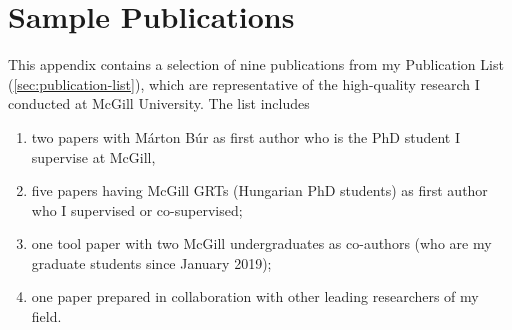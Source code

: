 \chapter{Sample Publications}
\label{sec:sample-publications}


This appendix contains a selection of nine publications from my Publication List (\autoref{sec:publication-list}), which are representative of the high-quality research I conducted at McGill University. The list includes 
\begin{enumerate}[leftmargin=0.5cm]
\item two papers with Márton Búr as first author who is the PhD student I supervise at McGill, 
\item five papers having McGill GRTs (Hungarian PhD students) as first author who I supervised or co-supervised;
\item one tool paper with two McGill undergraduates as co-authors (who are my graduate students since January 2019);
\item one paper prepared in collaboration with other leading researchers of my field.
\end{enumerate}

